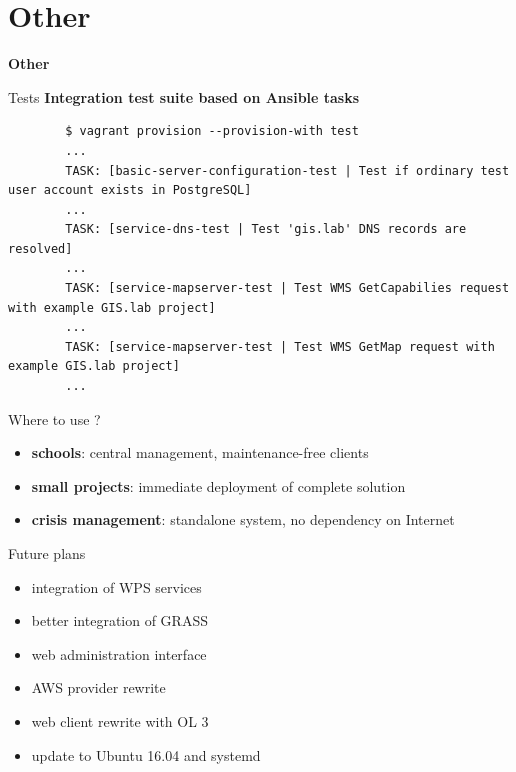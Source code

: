\documentclass[12pt]{beamer}
\begin{document}
\section{Other}
\begin{frame}
	\begin{center}
		\LARGE\textbf{Other}
	\end{center}
\end{frame}

\begin{frame}[fragile]{Tests}
	\textbf{Integration test suite based on Ansible tasks}
	
	\lstset{language=sh}
	\begin{lstlisting}
		$ vagrant provision --provision-with test
		...
		TASK: [basic-server-configuration-test | Test if ordinary test user account exists in PostgreSQL]
		...
		TASK: [service-dns-test | Test 'gis.lab' DNS records are resolved]
		...
		TASK: [service-mapserver-test | Test WMS GetCapabilies request with example GIS.lab project]
		...
		TASK: [service-mapserver-test | Test WMS GetMap request with example GIS.lab project]
		...
	\end{lstlisting}
\end{frame}

\begin{frame}{Where to use ?}
	\begin{itemize}
		\item \textbf{schools}: central management, maintenance-free clients
		\item \textbf{small projects}: immediate deployment of complete solution
		\item \textbf{crisis management}: standalone system, no dependency on Internet
	\end{itemize}
\end{frame}

\begin{frame}{Future plans}
	\begin{itemize}
		\item integration of WPS services
		\item better integration of GRASS
		\item web administration interface
		\item AWS provider rewrite
		\item web client rewrite with OL 3
		\item update to Ubuntu 16.04 and systemd
	\end{itemize}
\end{frame}
\end{document}
